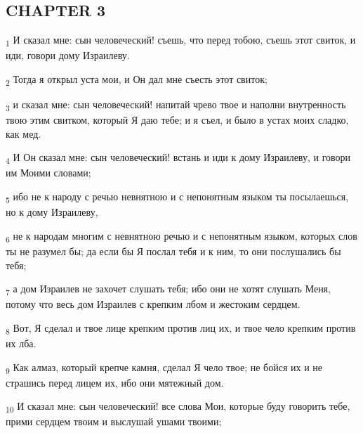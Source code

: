 \subsection{CHAPTER 3}
\begin{tcolorbox}
\textsubscript{1} И сказал мне: сын человеческий! съешь, что перед тобою, съешь этот свиток, и иди, говори дому Израилеву.
\end{tcolorbox}
\begin{tcolorbox}
\textsubscript{2} Тогда я открыл уста мои, и Он дал мне съесть этот свиток;
\end{tcolorbox}
\begin{tcolorbox}
\textsubscript{3} и сказал мне: сын человеческий! напитай чрево твое и наполни внутренность твою этим свитком, который Я даю тебе; и я съел, и было в устах моих сладко, как мед.
\end{tcolorbox}
\begin{tcolorbox}
\textsubscript{4} И Он сказал мне: сын человеческий! встань и иди к дому Израилеву, и говори им Моими словами;
\end{tcolorbox}
\begin{tcolorbox}
\textsubscript{5} ибо не к народу с речью невнятною и с непонятным языком ты посылаешься, но к дому Израилеву,
\end{tcolorbox}
\begin{tcolorbox}
\textsubscript{6} не к народам многим с невнятною речью и с непонятным языком, которых слов ты не разумел бы; да если бы Я послал тебя и к ним, то они послушались бы тебя;
\end{tcolorbox}
\begin{tcolorbox}
\textsubscript{7} а дом Израилев не захочет слушать тебя; ибо они не хотят слушать Меня, потому что весь дом Израилев с крепким лбом и жестоким сердцем.
\end{tcolorbox}
\begin{tcolorbox}
\textsubscript{8} Вот, Я сделал и твое лице крепким против лиц их, и твое чело крепким против их лба.
\end{tcolorbox}
\begin{tcolorbox}
\textsubscript{9} Как алмаз, который крепче камня, сделал Я чело твое; не бойся их и не страшись перед лицем их, ибо они мятежный дом.
\end{tcolorbox}
\begin{tcolorbox}
\textsubscript{10} И сказал мне: сын человеческий! все слова Мои, которые буду говорить тебе, прими сердцем твоим и выслушай ушами твоими;
\end{tcolorbox}
